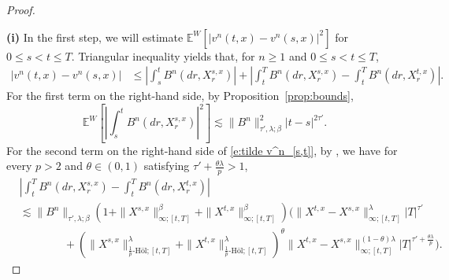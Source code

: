 \documentclass[11pt,reqno]{amsart}
\numberwithin{equation}{section}
\begin{document}
\begin{proof}
\ 

{\bf (i)} In the first step, we will estimate $\mathbb{E}^{W}\left[\left|v^{n}(t,x) - v^{n}(s,x)\right|^2\right]$ for $0\le s < t \le T$. Triangular inequality yields that,  for  $n\ge1$ and $0\le s < t\le T$,
\begin{equation}\label{e:tilde v^n_[s,t]}
\begin{aligned}
|v^{n}(t,x) - v^{n}(s,x)|&\le \left|\int_{s}^{t}B^{n}(dr,X^{s,x}_{r})\right| + \left|\int_{t}^{T}B^{n}(dr,X^{s,x}_{r}) - \int_{t}^{T}B^{n}(dr,X^{t,x}_{r})\right|.
\end{aligned}
\end{equation}
For the first term on the right-hand side, by Proposition~\ref{prop:bounds},
\begin{equation}\label{e:int_[s,t]B^n}
\mathbb{E}^{W}\left[\left|\int_{s}^{t}B^{n}(dr,X^{s,x}_{r})\right|^{2}\right]\lesssim \|B^{n}\|^{2}_{\tau',\lambda;\beta}|t - s|^{2\tau'}.
\end{equation}
For the second term on the right-hand side of \eqref{e:tilde v^n_[s,t]}, by \cite[Proposition~2.11]{HuLe}, we have for every $p>2$ and $\theta\in(0,1)$ satisfying $\tau' + \frac{\theta\lambda}{p} > 1$, 
\begin{equation}\label{e:B(dr,Xs) - B(dr,Xt)}
\begin{aligned}
&\left|\int_{t}^{T}B^{n}(dr,X^{s,x}_{r}) - \int_{t}^{T}B^{n}(dr,X^{t,x}_{r})\right| \\
&	 \lesssim \|B^{n}\|_{\tau',\lambda;\beta}\left(1 + \|X^{s,x}\|^{\beta}_{\infty;[t,T]} + \|X^{t,x}\|^{\beta}_{\infty;[t,T]}\right)\bigg(\|X^{t,x} - X^{s,x}\|^{\lambda}_{\infty;[t,T]}|T|^{\tau'} \\
&\quad\quad\quad \quad +\left(\|X^{s,x}\|^{\lambda}_{\frac{1}{p}\text{-H\"ol};[t,T]} + \|X^{t,x}\|^{\lambda}_{\frac{1}{p}\text{-H\"ol};[t,T]}\right)^{\theta}\|X^{t,x} - X^{s,x}\|^{(1-\theta)\lambda}_{\infty;[t,T]}|T|^{\tau' + \frac{\theta\lambda}{p}}\bigg).
\end{aligned}
\end{equation}




\end{proof}
\end{document}
